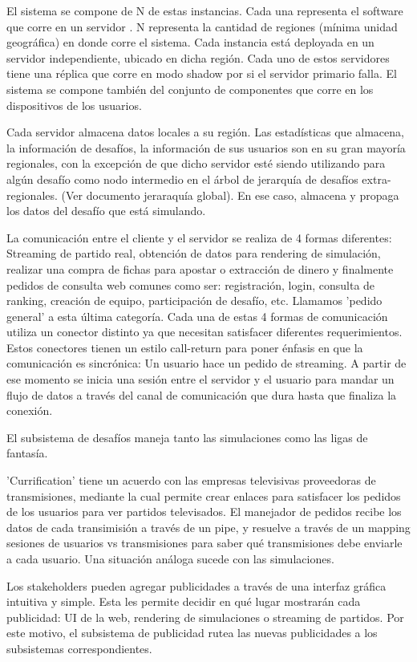 El sistema se compone de N de estas instancias. Cada una representa el software que corre en un servidor . N representa la cantidad de regiones (mínima unidad geográfica) en donde corre el sistema. Cada instancia está deployada en un servidor independiente, ubicado en dicha región. Cada uno de estos servidores tiene una réplica que corre en modo shadow por si el servidor primario falla.
El sistema se compone también del conjunto de componentes que corre en los dispositivos de los usuarios.

Cada servidor almacena datos locales a su región. Las estadísticas que almacena, la información de desafíos, la información de sus usuarios son en su gran mayoría regionales, con la excepción
de que dicho servidor esté siendo utilizando para algún desafío como nodo intermedio en el árbol de jerarquía de desafíos extra-regionales. (Ver documento jeraraquía global). En ese caso, 
almacena y propaga los datos del desafío que está simulando.

La comunicación entre el cliente y el servidor se realiza de 4 formas diferentes: Streaming de partido real, obtención de datos para rendering de simulación, realizar una compra de fichas
para apostar o extracción de dinero y finalmente pedidos de consulta web comunes como ser: registración, login, consulta de ranking, creación de equipo, participación de desafío, etc. Llamamos
'pedido general' a esta última categoría. Cada una de estas 4 formas de comunicación utiliza un conector distinto ya que necesitan satisfacer diferentes requerimientos. 
Estos conectores tienen un estilo call-return para poner énfasis en que la comunicación es sincrónica: Un usuario hace un pedido de streaming. A partir de ese momento se inicia una
sesión entre el servidor y el usuario para mandar un flujo de datos a través del canal de comunicación que dura hasta que finaliza la conexión.

El subsistema de desafíos maneja tanto las simulaciones como las ligas de fantasía. 

'Currification' tiene un acuerdo con las empresas televisivas proveedoras de transmisiones, mediante la cual permite crear enlaces para satisfacer los pedidos de los usuarios para ver
partidos televisados. El manejador de pedidos recibe los datos de cada transimisión a través de un pipe, y resuelve a través de un mapping sesiones de usuarios vs transmisiones para
saber qué transmisiones debe enviarle a cada usuario. Una situación análoga sucede con las simulaciones.

Los stakeholders pueden agregar publicidades a través de una interfaz gráfica intuitiva y simple. Esta les permite decidir en qué lugar mostrarán cada publicidad: UI de la web, 
rendering de simulaciones o streaming de partidos. Por este motivo, el subsistema de publicidad rutea las nuevas publicidades a los subsistemas correspondientes.

